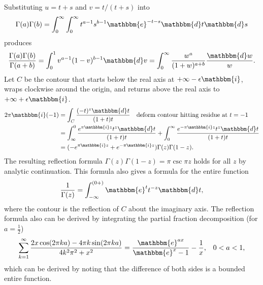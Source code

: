 \documentclass[12pt]{article}
\newcommand{\ee}[0] {\mathbbm{e}}
\newcommand{\ii}[0] {\mathbbm{i}}
\newcommand{\dd}[0] {\mathbbm{d}}
\numberwithin{equation}{section}
\begin{document}
Substituting $u=t+s$ and $v=t/(t+s)$ into
\begin{equation*}
\Gamma(a) \Gamma(b) = \int_0^{\infty} \int_0^{\infty} t^{a-1} s^{b-1} \ee^{-t-s} \dd t \dd s
\end{equation*}
produces
\begin{equation}
\label{equ_beta_integral}
\frac{\Gamma(a) \Gamma(b)}{\Gamma(a+b)} = \int_0^1 v^{a-1}(1-v)^{b-1} \dd v\\
= \int_0^{\infty} \frac{w^a}{(1+w)^{a+b}} \frac{\dd w}{w}\text{.}
\end{equation}
Let $C$ be the contour that starts below the real axis at $+\infty -\epsilon \ii$, wraps clockwise around the origin, and returns above the real axis to $+\infty +\epsilon \ii$.
\begin{align*}
2\pi \ii (-1) &= \int_C \frac{(-t)^z \dd t}{(1+t)t} \quad \text{deform contour hitting residue at } t = -1  \\
&= \int_{\infty}^{0} \frac{e^{\pi \ii z} t^z \dd t}{(1+t)t} + \int_{0}^{\infty} \frac{e^{-\pi \ii z} t^z \dd t}{(1+t)t}\\
&= (-e^{\pi \ii z} + e^{-\pi \ii z}) \Gamma(z)\Gamma(1-z)\text{.}
\end{align*}
The resulting reflection formula $\Gamma(z)\Gamma(1-z) = \pi \csc \pi z$ holds for all $z$ by analytic continuation. This formula also gives a formula for the entire function
\begin{equation}
\label{equ_gamma_hankel}
\frac{1}{\Gamma(z)} = \int_{-\infty}^{(0+)} \ee^t t^{-z} \dd t \text{,}
\end{equation}
where the contour is the reflection of $C$ about the imaginary axis.
The reflection formula also can be derived by integrating the partial fraction decomposition (for $a = \tfrac{1}{2}$)
\begin{equation}
\label{equ_bernoulli_pfrac}
\sum_{k=1}^{\infty} \frac{2x \cos (2\pi k a) - 4 \pi k \sin(2\pi k a)}{4k^2 \pi^2 + x^2} = \frac{\ee^{a x}}{\ee^x-1} - \frac{1}{x}\text{,} \quad 0 < a < 1\text{,}
\end{equation}
which can be derived by noting that the difference of both sides is a bounded entire function.
\end{document}
